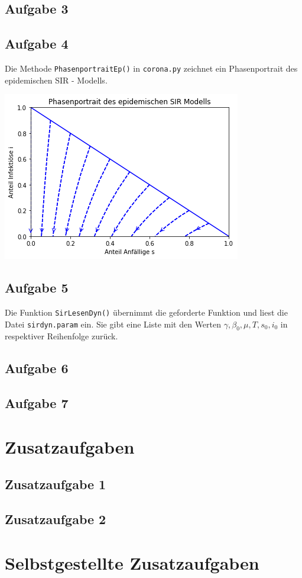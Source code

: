 \documentclass[12pt]{article}
\begin{document}
\subsection{Aufgabe 3}
\subsection{Aufgabe 4}
Die Methode \verb|PhasenportraitEp()| in \verb|corona.py| zeichnet ein Phasenportrait des epidemischen SIR - Modells.
\begin{center}
\includegraphics[scale=0.5]{PhasenportraitEpi.png}
\end{center}

\subsection{Aufgabe 5}
Die Funktion \verb|SirLesenDyn()| übernimmt die geforderte Funktion und liest die Datei \verb|sirdyn.param| ein. Sie gibt eine Liste mit den Werten $\gamma,\beta_0, \mu, T,s_0,i_0$ in respektiver Reihenfolge zurück.
\subsection{Aufgabe 6}
\subsection{Aufgabe 7}

\section{Zusatzaufgaben}

\subsection{Zusatzaufgabe 1}

\subsection{Zusatzaufgabe 2}


\section{Selbstgestellte Zusatzaufgaben}
\end{document}
